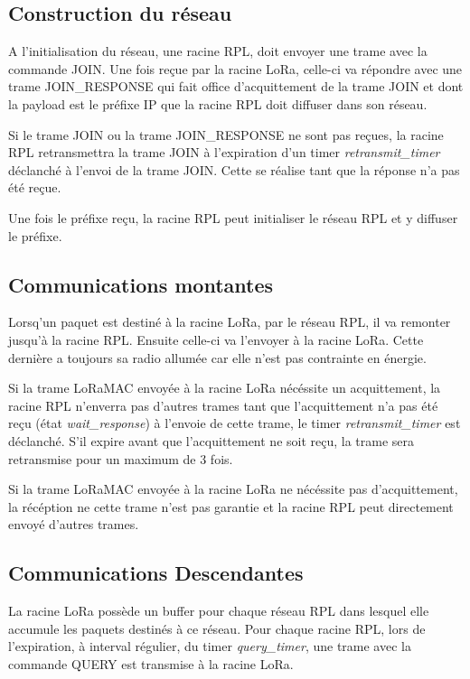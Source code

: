 \subsection{Construction du réseau}
    A l'initialisation du réseau, une racine RPL, doit envoyer une trame avec la commande JOIN. Une fois reçue par la racine LoRa, celle-ci va répondre avec une trame JOIN\_RESPONSE qui fait office d'acquittement de la trame JOIN et dont la payload est le préfixe IP que la racine RPL doit diffuser dans son réseau.

    Si le trame JOIN ou la trame JOIN\_RESPONSE ne sont pas reçues, la racine RPL retransmettra la trame JOIN à l'expiration d'un timer \textit{retransmit\_timer} déclanché à l'envoi de la trame JOIN. Cette se réalise tant que la réponse n'a pas été reçue.

    Une fois le préfixe reçu, la racine RPL peut initialiser le réseau RPL et y diffuser le préfixe.

\subsection{Communications montantes}
    Lorsq'un paquet est destiné à la racine LoRa, par le réseau RPL, il va remonter jusqu'à la racine RPL. Ensuite celle-ci va l'envoyer à la racine LoRa. Cette dernière a toujours sa radio allumée car elle n'est pas contrainte en énergie.

    Si la trame LoRaMAC envoyée à la racine LoRa nécéssite un acquittement, la racine RPL n'enverra pas d'autres trames tant que l'acquittement n'a pas été reçu (état \textit{wait\_response})
    à l'envoie de cette trame, le timer \textit{retransmit\_timer} est déclanché. S'il expire avant que l'acquittement ne soit reçu, la trame sera retransmise pour un maximum de 3 fois.

    Si la trame LoRaMAC envoyée à la racine LoRa ne nécéssite pas d'acquittement, la récéption ne cette trame n'est pas garantie et la racine RPL peut directement envoyé d'autres trames.

\subsection{Communications Descendantes}
    La racine LoRa possède un buffer pour chaque réseau RPL dans lesquel elle accumule les paquets destinés à ce réseau. Pour chaque racine RPL, lors de l'expiration, à interval régulier, du timer \textit{query\_timer}, une trame avec la commande QUERY est transmise à la racine LoRa.

